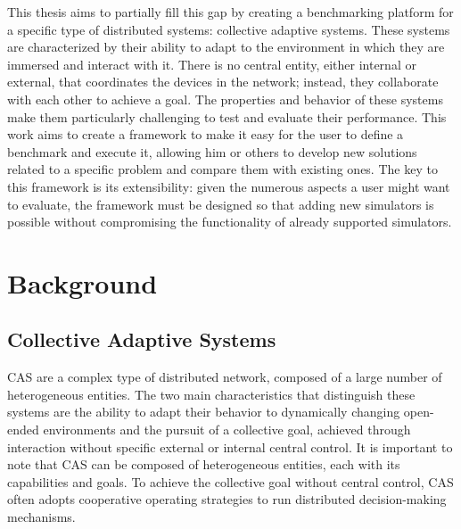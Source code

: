 \documentclass[12pt,a4paper,openright,twoside]{book}
\begin{document}
This thesis aims to partially fill this gap by creating a benchmarking platform \cite{DBLP:conf/cisis/VilenicaL12, DBLP:conf/atal/ZhangZWBR20} for a specific type of distributed systems: collective adaptive systems. \cite{DBLP:journals/sttt/NicolaJW20}
These systems are characterized by their ability to adapt to the environment in which they are immersed and interact with it. \cite{DBLP:conf/birthday/BucchiaroneM19}
There is no central entity, either internal or external, that coordinates the devices in the network; instead, they collaborate with each other to achieve a goal.
The properties and behavior of these systems make them particularly challenging to test and evaluate their performance. \cite{DBLP:conf/srds/AlmeidaMV10}
This work aims to create a framework to make it easy for the user to define a benchmark and execute it,
allowing him or others to develop new solutions related to a specific problem and compare them with existing ones.
The key to this framework is its extensibility: given the numerous aspects a user might want to evaluate,
the framework must be designed so that adding new simulators is possible without compromising the functionality of already supported simulators. \cite{DBLP:conf/mascots/Dujmovic99}

\chapter{Background}

\section{Collective Adaptive Systems}

\ac{CAS} are a complex type of distributed network, composed of a large number of heterogeneous entities.
The two main characteristics that distinguish these systems are the ability to adapt their behavior to dynamically changing open-ended environments
and the pursuit of a collective goal, achieved through interaction without specific external or internal central control. \cite{DBLP:series/lncs/HolzlRW08, DBLP:journals/corr/abs-1108-5643}
It is important to note that \ac{CAS} can be composed of heterogeneous entities, each with its capabilities and goals.
To achieve the collective goal without central control, \ac{CAS} often adopts cooperative operating strategies to run distributed decision-making mechanisms. \cite{DBLP:journals/tomacs/Aldini18} \\
\end{document}
